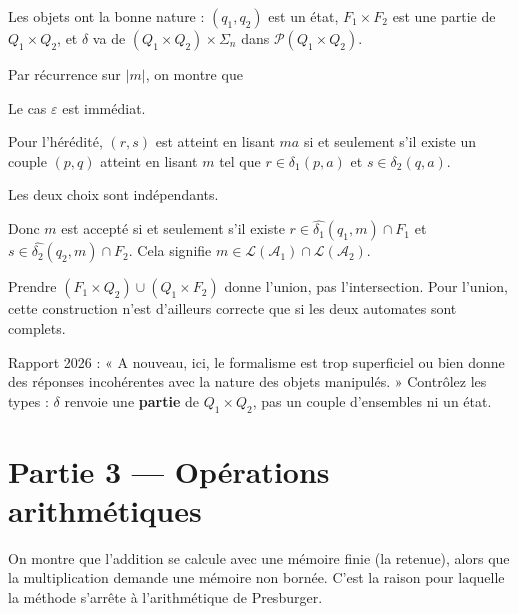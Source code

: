 \documentclass[11pt,a4paper]{article}
\newcommand{\equationajustee}[1]{%
  \sbox{\boiteequation}{$\displaystyle #1$}%
  \ifdim\wd\boiteequation>\linewidth
    \[\resizebox{\linewidth}{!}{\usebox{\boiteequation}}\]%
  \else
    \[#1\]%
  \fi}
\begin{document}
Les objets ont la bonne nature : \((q_1,q_2)\) est un état, \(F_1\times F_2\) est une partie de \(Q_1\times Q_2\), et \(\delta\) va de \((Q_1\times Q_2)\times\Sigma_n\) dans \(\mathcal{P}(Q_1\times Q_2)\).

Par récurrence sur \(\lvert m\rvert\), on montre que
\equationajustee{\widehat{\delta}((q_1,q_2),m)=\widehat{\delta_1}(q_1,m)\times\widehat{\delta_2}(q_2,m).}

Le cas \(\varepsilon\) est immédiat.

Pour l'hérédité, \((r,s)\) est atteint en lisant \(ma\) si et seulement s'il existe un couple \((p,q)\) atteint en lisant \(m\) tel que \(r\in\delta_1(p,a)\) et \(s\in\delta_2(q,a)\).

Les deux choix sont indépendants.

Donc \(m\) est accepté si et seulement s'il existe \(r\in\widehat{\delta_1}(q_1,m)\cap F_1\) et \(s\in\widehat{\delta_2}(q_2,m)\cap F_2\). Cela signifie \(m\in\mathcal{L}({\mathcal{A}}_1)\cap\mathcal{L}({\mathcal{A}}_2)\).

\begin{piege}

Prendre \((F_1\times Q_2)\cup(Q_1\times F_2)\) donne l'union, pas l'intersection. Pour l'union, cette construction n'est d'ailleurs correcte que si les deux automates sont complets.

\end{piege}

\begin{jury}

Rapport 2026 : « A nouveau, ici, le formalisme est trop superficiel ou bien donne des réponses incohérentes avec la nature des objets manipulés. » Contrôlez les types : \(\delta\) renvoie une \textbf{partie} de \(Q_1\times Q_2\), pas un couple d'ensembles ni un état.

\end{jury}

\hypertarget{partie-3-opuxe9rations-arithmuxe9tiques}{%
\section{Partie 3 --- Opérations arithmétiques}\label{partie-3-opuxe9rations-arithmuxe9tiques}}

On montre que l'addition se calcule avec une mémoire finie (la retenue), alors que la multiplication demande une mémoire non bornée. C'est la raison pour laquelle la méthode s'arrête à l'arithmétique de Presburger.
\end{document}
